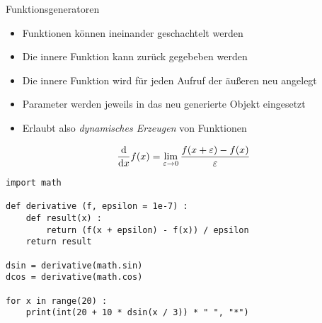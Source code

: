 
\begin{frame}[fragile]{Funktionsgeneratoren}
%
\begin{itemize}
\item Funktionen können ineinander geschachtelt werden
\item Die innere Funktion kann zurück gegebeben werden
\item Die innere Funktion wird für jeden Aufruf der äußeren neu angelegt
\item Parameter werden jeweils in das neu generierte Objekt eingesetzt
\item Erlaubt also \emph{dynamisches Erzeugen} von Funktionen
\end{itemize}
%
\end{frame}


\begin{frame}[fragile]
%
\begin{tcolorbox}[title=Differentialquotient]
	\begin{equation*}
	\dv{x} f(x)
=
	\lim_{\varepsilon \to 0}
		\frac
			{f(x + \varepsilon) - f(x)}
			{\varepsilon}
	\end{equation*}
\end{tcolorbox}
%
\begin{codebox}
\begin{verbatim}
import math

def derivative (f, epsilon = 1e-7) :
    def result(x) :
        return (f(x + epsilon) - f(x)) / epsilon
    return result

dsin = derivative(math.sin)
dcos = derivative(math.cos)

for x in range(20) :
    print(int(20 + 10 * dsin(x / 3)) * " ", "*")
\end{verbatim}
\end{codebox}
%
\end{frame}


